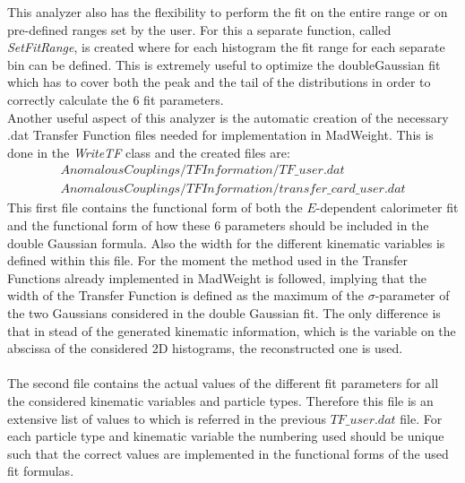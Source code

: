This analyzer also has the flexibility to perform the fit on the entire range or on pre-defined ranges set by the user. For this a separate function, called \textit{SetFitRange}, is created where for each histogram the fit range for each separate bin can be defined. This is extremely useful to optimize the doubleGaussian fit which has to cover both the peak and the tail of the distributions in order to correctly calculate the $6$ fit parameters.\\
Another useful aspect of this analyzer is the automatic creation of the necessary .dat Transfer Function files needed for implementation in MadWeight. This is done in the \textit{WriteTF} class and the created files are:
\begin{eqnarray*}
 AnomalousCouplings/TFInformation/TF\_user.dat \\
 AnomalousCouplings/TFInformation/transfer\_card\_user.dat
\end{eqnarray*}
This first file contains the functional form of both the $E$-dependent calorimeter fit and the functional form of how these $6$ parameters should be included in the double Gaussian formula. Also the width for the different kinematic variables is defined within this file. For the moment the method used in the Transfer Functions already implemented in MadWeight is followed, implying that the width of the Transfer Function is defined as the maximum of the $\sigma$-parameter of the two Gaussians considered in the double Gaussian fit. The only difference is that in stead of the generated kinematic information, which is the variable on the abscissa of the considered 2D histograms, the reconstructed one is used.\\
\\
The second file contains the actual values of the different fit parameters for all the considered kinematic variables and particle types. Therefore this file is an extensive list of values to which is referred in the previous $TF\_user.dat$ file. For each particle type and kinematic variable the numbering used should be unique such that the correct values are implemented in the functional forms of the used fit formulas.

